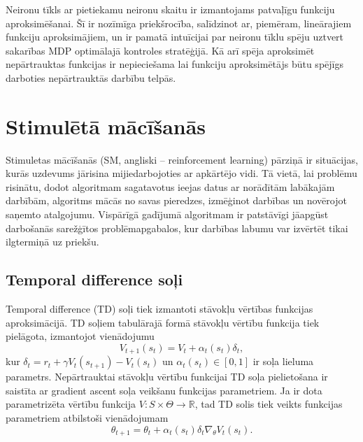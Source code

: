 \documentclass[a0,landscape]{a0poster}
\numberwithin{equation}{section}
\theoremstyle{definition}
\theoremstyle{plain}
\begin{document}
\begin{multicols}{5}
Neironu tīkls ar pietiekamu neironu skaitu ir izmantojams patvaļīgu funkciju aproksimēšanai.
Šī ir nozīmīga priekšrocība, salīdzinot ar, piemēram, lineārajiem funkciju aproksimājiem, un ir pamatā intuīcijai par neironu tīklu spēju uztvert sakarības MDP optimālajā kontroles stratēģijā.
Kā arī spēja aproksimēt nepārtrauktas funkcijas ir nepieciešama lai funkciju aproksimētājs būtu spējīgs darboties nepārtrauktās darbību telpās.

\section*{Stimulētā mācīšanās}
Stimuletas mācīšanās (SM, angliski -- reinforcement learning) pārziņā ir situācijas, kurās uzdevums jārisina mijiedarbojoties ar apkārtējo vidi. 
Tā vietā, lai problēmu risinātu, dodot algoritmam sagatavotus ieejas datus ar norādītām labākajām darbībām, algoritms mācās no savas pieredzes, izmēģinot darbības un novērojot saņemto atalgojumu.
Vispārīgā gadījumā algoritmam ir patstāvīgi jāapgūst darbošanās sarežģītos problēmapgabalos, kur darbības labumu var izvērtēt tikai ilgtermiņā uz priekšu.

\subsection*{Temporal difference soļi} \label{chap:td}
Temporal difference (TD) soļi tiek izmantoti stāvokļu vērtības funkcijas aproksimācijā.
TD soļiem tabulārajā formā stāvokļu vērtību funkcija tiek pielāgota, izmantojot vienādojumu
\[
	V_{t+1}(s_t) = V_t + \alpha_t(s_t) \delta_t,
\]
kur $\delta_t = r_{t} + \gamma V_t(s_{t + 1}) - V_t(s_t)$ un $\alpha_t(s_t) \in [0,1]$ ir soļa lieluma parametrs.
Nepārtrauktai stāvokļu vērtību funkcijai TD soļa pielietošana ir saistīta ar gradient ascent soļa veikšanu funkcijas parametriem.
Ja ir dota parametrizēta vērtību funkcija $V:S \times \Theta \rightarrow \mathbb{R}$, tad TD solis tiek veikts funkcijas parametriem atbilstoši vienādojumam
\[
	\theta_{t+1} = \theta_t + \alpha_t(s_t) \delta_t \nabla_\theta V_t(s_t).
\]


\end{multicols}
\end{document}
